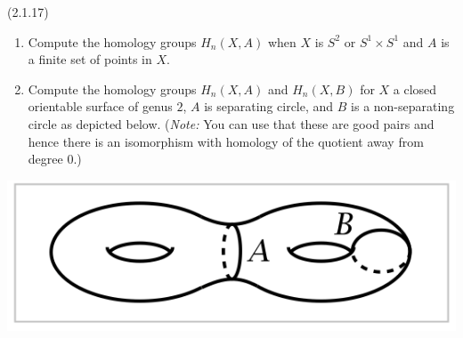 \documentclass[12pt]{article}
\begin{document}
\begin{problem}{5}(2.1.17)
    \begin{enumerate}
        \item Compute the homology groups $H_n(X,A)$ when $X$ is $S^2$ or $S^1 \times S^1$ and $A$ is a finite set of points in $X$.
        \item Compute the homology groups $H_n(X,A)$ and $H_n(X,B)$ for $X$ a closed orientable surface of genus $2$, $A$ is separating circle, and $B$ is a non-separating circle as depicted below. (\emph{Note:} You can use that these are good pairs and hence there is an isomorphism with homology of the quotient away from degree $0$.)
    \end{enumerate} 
    \begin{centering}
    \includegraphics{assets/HW7Image.png}
    \end{centering}  
\end{problem}
\end{document}
